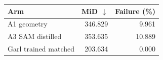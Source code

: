 \begin{tabular}{lrr}
\toprule
Arm & MiD $\downarrow$ & Failure (\%) \\
\midrule
A1 geometry & 346.829 & 9.961 \\
A3 SAM distilled & 353.635 & 10.889 \\
Garl trained matched & 203.634 & 0.000 \\
\bottomrule
\end{tabular}
